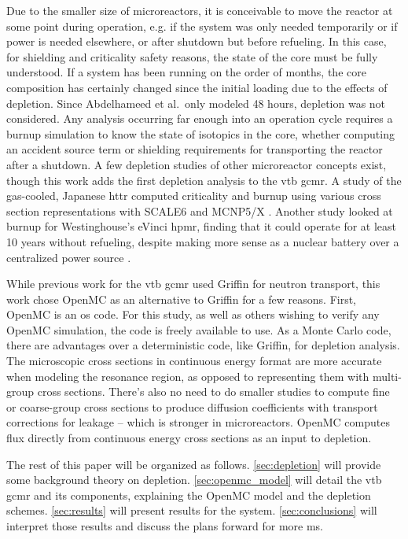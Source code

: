 \documentclass[letterpaper]{physor2024}
\begin{document}
Due to the smaller size of microreactors, it is conceivable to move the reactor at some point during operation, e.g. if the system was only needed temporarily or if power is needed elsewhere, or after shutdown but before refueling. In this case, for shielding and criticality safety reasons, the state of the core must be fully understood. If a system has been running on the order of months, the core composition has certainly changed since the initial loading due to the effects of depletion. Since Abdelhameed et al.~only modeled 48 hours, depletion was not considered. Any analysis occurring far enough into an operation cycle requires a burnup simulation to know the state of isotopics in the core, whether computing an accident source term or shielding requirements for transporting the reactor after a shutdown. A few depletion studies of other microreactor concepts exist, though this work adds the first depletion analysis to the \gls{vtb} \gls{gcmr}. A study of the gas-cooled, Japanese \gls{httr} computed criticality and burnup using various cross section representations with SCALE6 and MCNP5/X \cite{chiang-gcmr}. Another study looked at burnup for Westinghouse's eVinci \gls{hpmr}, finding that it could operate for at least 10 years without refueling, despite making more sense as a nuclear battery over a centralized power source \cite{Hernandez-hpmr}.

While previous work for the \gls{vtb} \gls{gcmr} used Griffin for neutron transport, this work chose OpenMC as an alternative to Griffin for a few reasons. First, OpenMC is an \gls{os} code. For this study, as well as others wishing to verify any OpenMC simulation, the code is freely available to use. As a Monte Carlo code, there are advantages over a deterministic code, like Griffin, for depletion analysis. The microscopic cross sections in continuous energy format are more accurate when modeling the resonance region, as opposed to representing them with multi-group cross sections. There's also no need to do smaller studies to compute fine or coarse-group cross sections to produce diffusion coefficients with transport corrections for leakage -- which is stronger in microreactors. OpenMC computes flux directly from continuous energy cross sections as an input to depletion.

The rest of this paper will be organized as follows. \cref{sec:depletion} will provide some background theory on depletion. \cref{sec:openmc_model}  will detail the \gls{vtb} \gls{gcmr} and its components, explaining the OpenMC model and the depletion schemes. \cref{sec:results} will present results for the system. \cref{sec:conclusions} will interpret those results and discuss the plans forward for more \gls{ms}.
\end{document}
